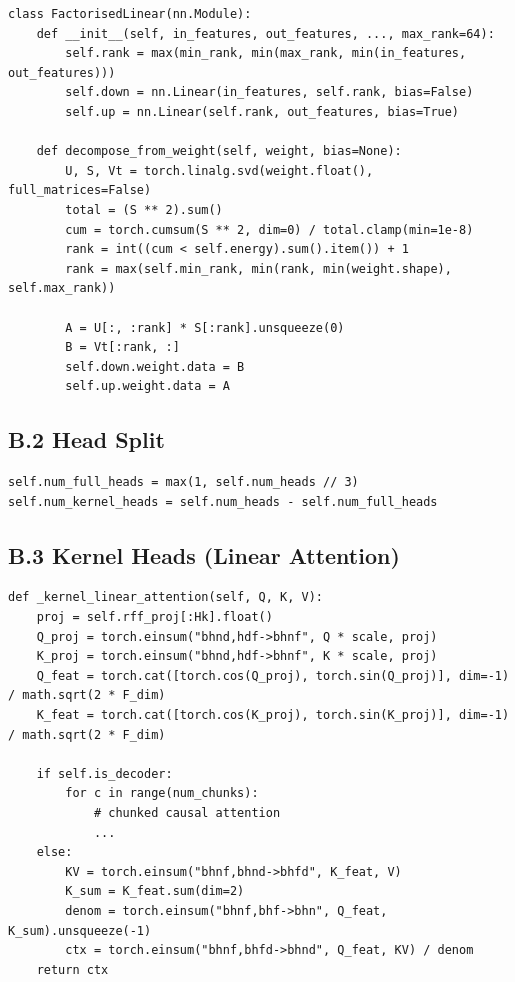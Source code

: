 \begin{lstlisting}
class FactorisedLinear(nn.Module):
    def __init__(self, in_features, out_features, ..., max_rank=64):
        self.rank = max(min_rank, min(max_rank, min(in_features, out_features)))
        self.down = nn.Linear(in_features, self.rank, bias=False)
        self.up = nn.Linear(self.rank, out_features, bias=True)

    def decompose_from_weight(self, weight, bias=None):
        U, S, Vt = torch.linalg.svd(weight.float(), full_matrices=False)
        total = (S ** 2).sum()
        cum = torch.cumsum(S ** 2, dim=0) / total.clamp(min=1e-8)
        rank = int((cum < self.energy).sum().item()) + 1
        rank = max(self.min_rank, min(rank, min(weight.shape), self.max_rank))
        
        A = U[:, :rank] * S[:rank].unsqueeze(0)
        B = Vt[:rank, :]
        self.down.weight.data = B
        self.up.weight.data = A
\end{lstlisting}

\subsection{B.2 Head Split}

\begin{lstlisting}
self.num_full_heads = max(1, self.num_heads // 3)
self.num_kernel_heads = self.num_heads - self.num_full_heads
\end{lstlisting}

\subsection{B.3 Kernel Heads (Linear Attention)}

\begin{lstlisting}
def _kernel_linear_attention(self, Q, K, V):
    proj = self.rff_proj[:Hk].float()
    Q_proj = torch.einsum("bhnd,hdf->bhnf", Q * scale, proj)
    K_proj = torch.einsum("bhnd,hdf->bhnf", K * scale, proj)
    Q_feat = torch.cat([torch.cos(Q_proj), torch.sin(Q_proj)], dim=-1) / math.sqrt(2 * F_dim)
    K_feat = torch.cat([torch.cos(K_proj), torch.sin(K_proj)], dim=-1) / math.sqrt(2 * F_dim)
    
    if self.is_decoder:
        for c in range(num_chunks):
            # chunked causal attention
            ...
    else:
        KV = torch.einsum("bhnf,bhnd->bhfd", K_feat, V)
        K_sum = K_feat.sum(dim=2)
        denom = torch.einsum("bhnf,bhf->bhn", Q_feat, K_sum).unsqueeze(-1)
        ctx = torch.einsum("bhnf,bhfd->bhnd", Q_feat, KV) / denom
    return ctx
\end{lstlisting}


